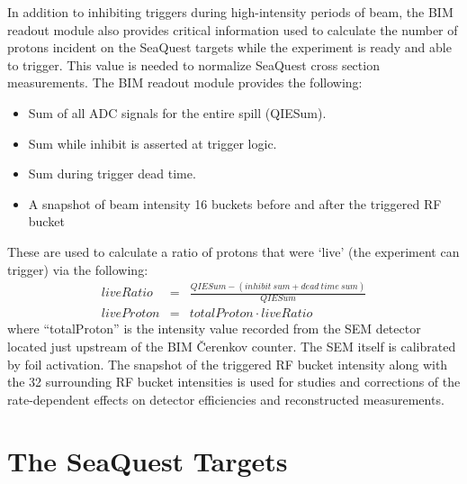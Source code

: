 In addition to inhibiting triggers during high-intensity periods of beam, the BIM readout module also provides critical
information used to calculate the number of protons incident on the SeaQuest targets while the experiment is ready
and able to trigger. This value is needed to normalize SeaQuest cross section measurements. The BIM readout module provides the following:
\begin{itemize}
\item Sum of all ADC signals for the entire spill (QIESum).
\item Sum while inhibit is asserted at trigger logic.
\item Sum during trigger dead time.
\item A snapshot of beam intensity 16 buckets before and after the triggered RF bucket
\end{itemize}

These are used to calculate a ratio of protons that were `live' (the experiment can trigger) via the following:
\begin{eqnarray}
	liveRatio & = & \frac{QIESum - (inhibit\ sum + dead\ time\ sum)}{QIESum} \\
	liveProton & = & totalProton \cdot liveRatio
	\label{eqn:liveproton}
\end{eqnarray}
where ``totalProton'' is the intensity value recorded from the SEM detector located just upstream of the BIM \v{C}erenkov counter. The SEM itself is calibrated by foil activation. The snapshot of the triggered RF bucket intensity along with the 32 surrounding RF bucket intensities is used for studies and corrections of the rate-dependent effects on detector efficiencies and reconstructed measurements.

\section{The SeaQuest Targets}

